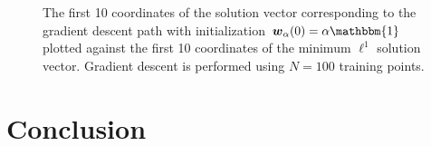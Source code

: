 \documentclass{article}
\begin{document}
\begin{figure}[H]
    \centering
    \hfill
    \caption{The first 10 coordinates of the solution vector corresponding to the gradient descent path with initialization $\boldsymbol{w}_{\alpha}(0) = \alpha \mathbbm{1}$ plotted against the first 10 coordinates of the minimum $\ell^1$ solution vector. Gradient descent is performed using $N=100$ training points.}\label{}
\end{figure}

\section{Conclusion}

\pagebreak



\end{document}
